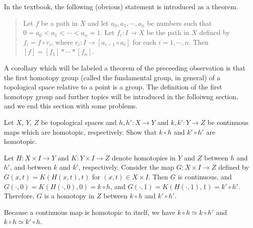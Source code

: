 \begin{rmk}
    In the textbook, the following (obvious) statement is introduced as a theorem.
    \begin{quotation}
        Let $f$ be a path in $X$ and let $a_0, a_1, \cdots, a_n$ be numbers such that $0=a_0<a_1<\cdots<a_n=1$.
        Let $f_i: I\rightarrow X$ be the path in $X$ defined by $f_i=f\circ r_i$, where $r_i: I\rightarrow[a_{i-1}\circ a_i]$ for each $i=1, \cdots, n$.
        Then $[f]=[f_1]*\cdots*[f_n]$.
    \end{quotation}
\end{rmk}

A corollary which will be labeled a theorem of the preceeding observation is that the first homotopy group (called the fundamental group, in general) of a topological space relative to a point is a group.
The definition of the first homotopy group and further topics will be introduced in the folloiwng section, and we end this section with some problems.

\begin{prob}
    Let $X,\, Y,\, Z$ be topological spaces and $h, h': X\rightarrow Y$ and $k, k': Y\rightarrow Z$ be continuous maps which are homotopic, respectively.
    Show that $k\circ h$ and $k'\circ h'$ are homotopic.
\end{prob}
\begin{sol}
    Let $H: X\times I\rightarrow Y$ and $K: Y\times I\rightarrow Z$ denote homotopies in $Y$ and $Z$ between $h$ and $h'$, and between $k$ and $k'$, respectively.
    Consider the map $G: X\times I\rightarrow Z$ defined by $G(x, t)=K(H(x, t), t)$ for $(x, t)\in X\times I$.
    Then $G$ is continuous, and $G(\cdot, 0)=K(H(\cdot, 0), 0)=k\circ h$, and $G(\cdot, 1)=K(H(\cdot, 1), 1)=k'\circ h'$.
    Therefore, $G$ is a homotopy in $Z$ between $k\circ h$ and $k'\circ h'$.
\end{sol}
\begin{rmk}
    Because a continuous map is homotopic to itself, we have $k\circ h\simeq k\circ h'$ and $k\circ h\simeq k'\circ h$.
\end{rmk}

